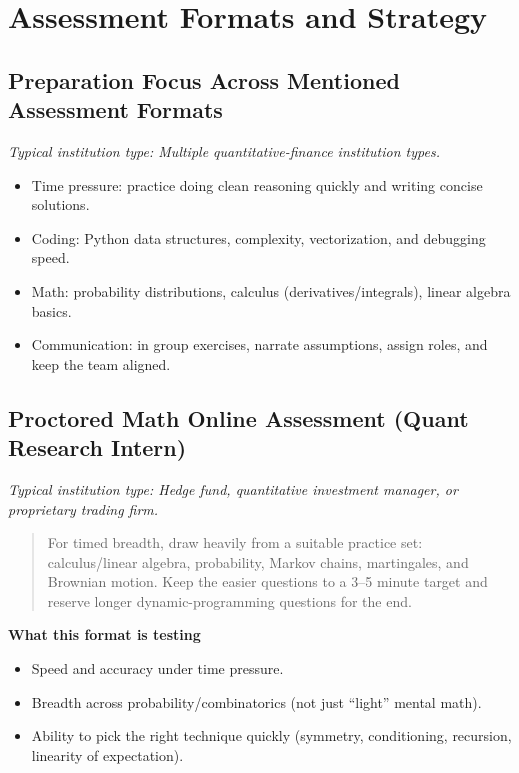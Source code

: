 \documentclass[11pt,letterpaper,openany]{book}
\newcommand{\RoleProfile}[2]{%
  \subsection{#1}%
  \noindent\textit{Typical institution type: #2.}\par
}
\newcommand{\playbooknote}[1]{\begin{quote}\small #1\end{quote}}
\begin{document}
\section{Assessment Formats and Strategy}

\RoleProfile{Preparation Focus Across Mentioned Assessment Formats}{Multiple quantitative-finance institution types}
\begin{itemize}
  \item Time pressure: practice doing clean reasoning quickly and writing concise solutions.
  \item Coding: Python data structures, complexity, vectorization, and debugging speed.
  \item Math: probability distributions, calculus (derivatives/integrals), linear algebra basics.
  \item Communication: in group exercises, narrate assumptions, assign roles, and keep the team aligned.
\end{itemize}

\RoleProfile{Proctored Math Online Assessment (Quant Research Intern)}{Hedge fund, quantitative investment manager, or proprietary trading firm}
\playbooknote{For timed breadth, draw heavily from a suitable practice set: calculus/linear algebra, probability, Markov chains, martingales, and Brownian motion. Keep the easier questions to a 3--5 minute target and reserve longer dynamic-programming questions for the end.}
\textbf{What this format is testing}
\begin{itemize}
  \item Speed and accuracy under time pressure.
  \item Breadth across probability/combinatorics (not just ``light'' mental math).
  \item Ability to pick the right technique quickly (symmetry, conditioning, recursion, linearity of expectation).
\end{itemize}
\end{document}
